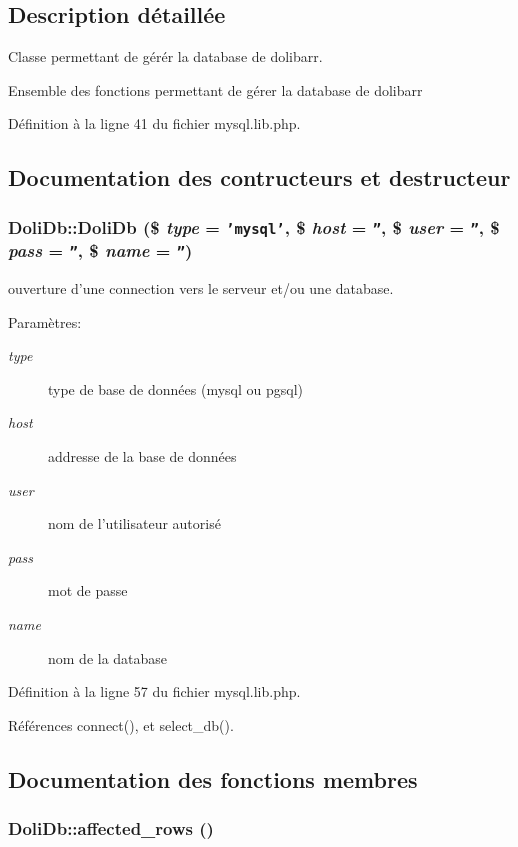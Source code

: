 \subsection{Description d\'{e}taill\'{e}e}
Classe permettant de g\'{e}r\'{e}r la database de dolibarr. 

Ensemble des fonctions permettant de g\'{e}rer la database de dolibarr 



D\'{e}finition \`{a} la ligne 41 du fichier mysql.lib.php.

\subsection{Documentation des contructeurs et destructeur}
\hypertarget{classDoliDb_a0}{
\subsubsection[DoliDb]{\setlength{\rightskip}{0pt plus 5cm}Doli\-Db::Doli\-Db (\$ {\em type} = {\tt 'mysql'}, \$ {\em host} = {\tt ''}, \$ {\em user} = {\tt ''}, \$ {\em pass} = {\tt ''}, \$ {\em name} = {\tt ''})}}
\label{classDoliDb_a0}


ouverture d'une connection vers le serveur et/ou une database. 

\begin{Desc}
\item[Param\`{e}tres:]
\begin{description}
\item[{\em type}]type de base de donn\'{e}es (mysql ou pgsql) \item[{\em host}]addresse de la base de donn\'{e}es \item[{\em user}]nom de l'utilisateur autoris\'{e} \item[{\em pass}]mot de passe \item[{\em name}]nom de la database \end{description}
\end{Desc}


D\'{e}finition \`{a} la ligne 57 du fichier mysql.lib.php.

R\'{e}f\'{e}rences connect(), et select\_\-db().

\subsection{Documentation des fonctions membres}
\hypertarget{classDoliDb_a26}{
\subsubsection[affected\_\-rows]{\setlength{\rightskip}{0pt plus 5cm}Doli\-Db::affected\_\-rows ()}}
\label{classDoliDb_a26}


